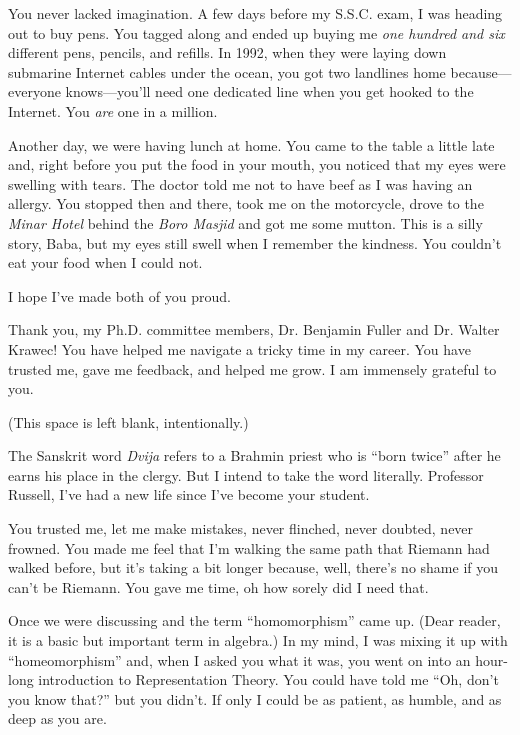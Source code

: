 You never lacked imagination. 
 A few days before my S.S.C. exam, I was heading out to buy pens. 
 You tagged along and ended up buying me \emph{one hundred and six} 
 different pens, pencils, and refills. 
 In 1992, when they were laying down submarine Internet cables under the ocean, 
 you got two landlines home because---everyone knows---you'll need one dedicated line 
 when you get hooked to the Internet. 
 You \emph{are} one in a million.

 Another day, we were having lunch at home. 
 You came to the table a little late and, 
 right before you put the food in your mouth, 
 you noticed that my eyes were swelling with tears. 
 The doctor told me not to have beef as I was having an allergy. 
 You stopped then and there, took me on the motorcycle, 
 drove to the \emph{Minar Hotel} behind the \emph{Boro Masjid} 
 and got me some mutton. 
 This is a silly story, Baba, 
 but my eyes still swell when I remember the kindness. 
 You couldn't eat your food when I could not.

 I hope I've made both of you proud. 

\AckBreak
Thank you, my Ph.D. committee members, Dr. Benjamin Fuller and Dr. Walter Krawec! 
You have helped me navigate a tricky time in my career. 
You have trusted me, gave me feedback, and helped me grow. 
I am immensely grateful to you.

 \vfill
 \begin{center}(This space is left blank, intentionally.)\end{center}
 \vfill
 \newpage

  \AckBreak
  The Sanskrit word \emph{Dvija} refers to a Brahmin priest who is  
  ``born twice'' after he earns his place in the clergy. 
  But I intend to take the word literally. 
  Professor Russell, I've had a new life since I've become your student. 

  You trusted me, let me make mistakes, never flinched, never doubted, 
  never frowned. You made me feel that I'm walking the same path that Riemann had walked before, 
  but it's taking a bit longer because, well, there's no shame if you can't be Riemann. 
  You gave me time, oh how sorely did I need that. 
  
  Once we were discussing and the term ``homomorphism'' came up. 
  (Dear reader, it is a basic but important term in algebra.)
  In my mind, I was mixing it up with ``homeomorphism'' 
  and, when I asked you what it was, you went on into an hour-long 
  introduction to Representation Theory. 
  You could have told me ``Oh, don't you know that?'' but you didn't. 
  If only I could be as patient, as humble, and as deep as you are.

